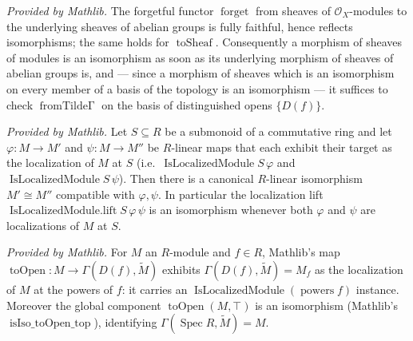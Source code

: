 \begin{lemma}
  \label{lem:forget_reflectsIso_mathlib}
  \mathlibok
  \textit{Provided by Mathlib.}
  The forgetful functor \(\operatorname{forget}\) from sheaves of \(\mathcal{O}_X\)-modules to the
  underlying sheaves of abelian groups is fully faithful, hence reflects isomorphisms; the same holds
  for \(\operatorname{toSheaf}\). Consequently a morphism of sheaves of modules is an isomorphism as
  soon as its underlying morphism of sheaves of abelian groups is, and — since a morphism of sheaves
  which is an isomorphism on every member of a basis of the topology is an isomorphism — it suffices
  to check \(\operatorname{fromTilde\Gamma}\) on the basis of distinguished opens \(\{D(f)\}\).
\end{lemma}

\begin{lemma}
  \label{lem:isLocalizedModule_linearEquiv_mathlib}
  \mathlibok
  \textit{Provided by Mathlib.}
  Let \(S \subseteq R\) be a submonoid of a commutative ring and let \(\varphi : M \to M'\) and
  \(\psi : M \to M''\) be \(R\)-linear maps that each exhibit their target as the localization of
  \(M\) at \(S\) (i.e.\ \(\operatorname{IsLocalizedModule} S\, \varphi\) and
  \(\operatorname{IsLocalizedModule} S\, \psi\)). Then there is a canonical \(R\)-linear isomorphism
  \(M' \cong M''\) compatible with \(\varphi, \psi\). In particular the localization lift
  \(\operatorname{IsLocalizedModule.lift} S\, \varphi\, \psi\) is an isomorphism whenever both
  \(\varphi\) and \(\psi\) are localizations of \(M\) at \(S\).
\end{lemma}

\begin{lemma}
  \label{lem:tilde_toOpen_isLocalizedModule_mathlib}
  \mathlibok
  \textit{Provided by Mathlib.}
  For \(M\) an \(R\)-module and \(f \in R\), Mathlib's map
  \(\operatorname{toOpen} : M \to \Gamma(D(f), \widetilde{M})\) exhibits \(\Gamma(D(f), \widetilde{M}) =
  M_f\) as the localization of \(M\) at the powers of \(f\): it carries an
  \(\operatorname{IsLocalizedModule}(\operatorname{powers} f)\) instance. Moreover the global component
  \(\operatorname{toOpen}(M, \top)\) is an isomorphism (Mathlib's
  \(\operatorname{isIso\_toOpen\_top}\)), identifying \(\Gamma(\operatorname{Spec} R, \widetilde{M}) =
  M\).
\end{lemma}


